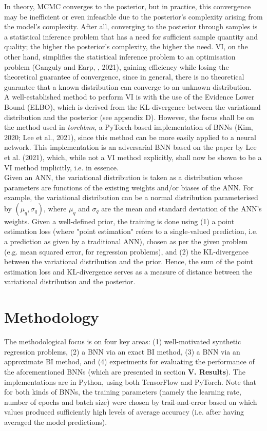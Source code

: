 \documentclass[conference]{IEEEtran}
\begin{document}
In theory, MCMC converges to the posterior, but in practice, this convergence may be inefficient or even infeasible due to the posterior's complexity arising from the model's complexity. After all, converging to the posterior through samples is a statistical inference problem that has a need for sufficient sample quantity and quality; the higher the posterior's complexity, the higher the need. VI, on the other hand, simplifies the statistical inference problem to an optimisation problem (Ganguly and Earp, , 2021), gaining efficiency while losing the theoretical guarantee of convergence, since in general, there is no theoretical guarantee that a known distribution can converge to an unknown distribution.\\

A well-established method to perform VI is with the use of the Evidence Lower Bound (ELBO), which is derived from the KL-divergence between the variational distribution and the posterior (see appendix D). However, the focus shall be on the method used in \textit{torchbnn}, a PyTorch-based implementation of BNNs (Kim, 2020; Lee et al., 2021), since this method can be more easily applied to a neural network. This implementation is an adversarial BNN based on the paper by Lee et al. (2021), which, while not a VI method explicitly, shall now be shown to be a VI method implicitly, i.e. in essence.\\

Given an ANN, the variational distribution is taken as a distribution whose parameters are functions of the existing weights and/or biases of the ANN. For example, the variational distribution can be a normal distribution parameterised by $(\mu_q, \sigma_q)$, where $\mu_q$ and $\sigma_q$ are the mean and standard deviation of the ANN's weights. Given a well-defined prior, the training is done using (1) a point estimation loss (where "point estimation" refers to a single-valued prediction, i.e. a prediction as given by a traditional ANN), chosen as per the given problem (e.g. mean squared error, for regression problems), and (2) the KL-divergence between the variational distribution and the prior. Hence, the sum of the point estimation loss and KL-divergence serves as a measure of distance between the variational distribution and the posterior.

\section{Methodology}
The methodological focus is on four key areas: (1) well-motivated synthetic regression problems, (2) a BNN via an exact BI method, (3) a BNN via an approximate BI method, and (4) experiments for evaluating the performance of the aforementioned BNNs (which are presented in section \textbf{V. Results}). The implementations are in Python, using both TensorFlow and PyTorch. Note that for both kinds of BNNs, the training parameters (namely the learning rate, number of epochs and batch size) were chosen by trail-and-error based on which values produced sufficiently high levels of average accuracy (i.e. after having averaged the model predictions).
\end{document}
